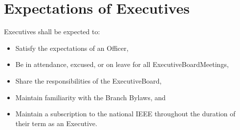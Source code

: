 \section{Expectations of \Glspl{Executive}}\label{Bylaw:Membership:ExecutiveExpectations}
	\Glspl{Executive} shall be expected to:
	\begin{itemize}
		\item{Satisfy the expectations of an \gls{Officer},}
		\item{Be in attendance, excused, or on leave for all \glspl{ExecutiveBoardMeeting},}
		\item{Share the responsibilities of the \gls{ExecutiveBoard},}
		\item{Maintain familiarity with the \gls{Branch} \glspl{Bylaw}, and }
		\item{Maintain a subscription to the national \gls{IEEE} throughout the duration of their term as an \gls{Executive}.}
	\end{itemize}

